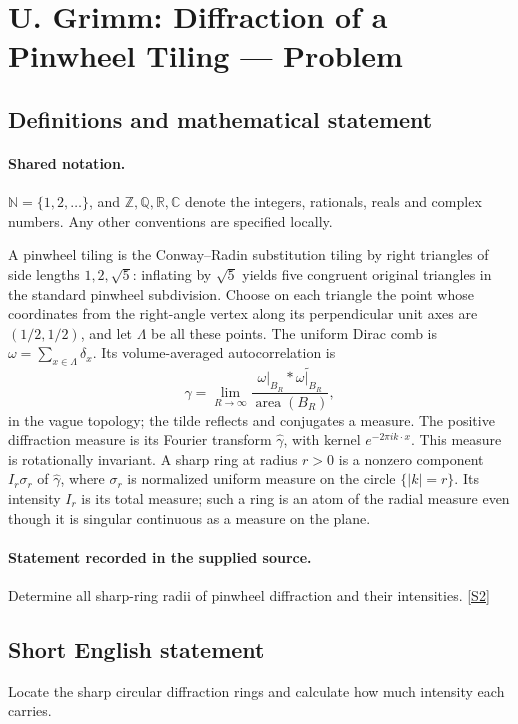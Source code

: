 \documentclass[11pt]{article}
\newcommand{\sref}[2]{\hyperlink{source:#1:#2}{[S#2]}}
\begin{document}
\section{U. Grimm: Diffraction of a Pinwheel Tiling — Problem}\label{statement}

\subsection{Definitions and mathematical statement}

\paragraph{Shared notation.}$\mathbb N=\{1,2,\ldots\}$, and $\mathbb Z,\mathbb Q,\mathbb R,\mathbb C$ denote the integers, rationals, reals and complex numbers. Any other conventions are specified locally.


A pinwheel tiling is the Conway--Radin substitution tiling by right triangles of side lengths $1,2,\sqrt5$: inflating by $\sqrt5$ yields five congruent original triangles in the standard pinwheel subdivision. Choose on each triangle the point whose coordinates from the right-angle vertex along its perpendicular unit axes are $(1/2,1/2)$, and let $\Lambda$ be all these points. The uniform Dirac comb is $\omega=\sum_{x\in\Lambda}\delta_x$. Its volume-averaged autocorrelation is
\[\gamma=\lim_{R\to\infty}\frac{\omega|_{B_R}*\widetilde{\omega|_{B_R}}}{\operatorname{area}(B_R)},\]
in the vague topology; the tilde reflects and conjugates a measure. The positive diffraction measure is its Fourier transform $\widehat\gamma$, with kernel $e^{-2\pi i k\cdot x}$. This measure is rotationally invariant. A sharp ring at radius $r>0$ is a nonzero component $I_r\sigma_r$ of $\widehat\gamma$, where $\sigma_r$ is normalized uniform measure on the circle $\{|k|=r\}$. Its intensity $I_r$ is its total measure; such a ring is an atom of the radial measure even though it is singular continuous as a measure on the plane.
\paragraph{Statement recorded in the supplied source.}
Determine all sharp-ring radii of pinwheel diffraction and their intensities. \sref{statement}{2}
\subsection{Short English statement}
Locate the sharp circular diffraction rings and calculate how much intensity each carries.
\end{document}
